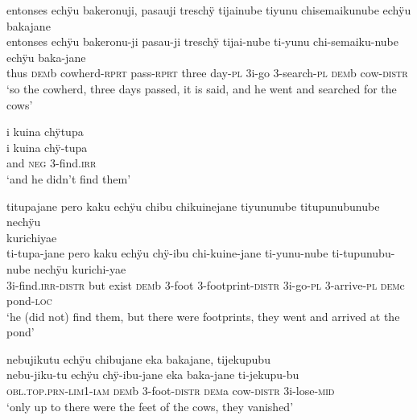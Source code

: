 \ea%
\begingl 
\glpreamble entonses echÿu bakeronuji, pasauji treschÿ tijainube tiyunu chisemaikunube echÿu \\bakajane\\
\gla entonses echÿu bakeronu-ji pasau-ji treschÿ tijai-nube ti-yunu chi-semaiku-nube echÿu baka-jane\\ 
\glb thus \textsc{dem}b cowherd-\textsc{rprt} pass-\textsc{rprt} three day-\textsc{pl} 3i-go 3-search-\textsc{pl} \textsc{dem}b cow-\textsc{distr}\\ 
\glft ‘so the cowherd, three days passed, it is said, and he went and searched for the cows’\\ 
\endgl
\xe

\ea%
\begingl 
\glpreamble i kuina chÿtupa\\
\gla i kuina chÿ-tupa\\ 
\glb and \textsc{neg} 3-find.\textsc{irr}\\ 
\glft ‘and he didn’t find them’\\ 
\endgl
\xe

\ea%
\begingl 
\glpreamble titupajane pero kaku echÿu chibu chikuinejane tiyununube titupunubunube nechÿu \\kurichiyae\\
\gla ti-tupa-jane pero kaku echÿu chÿ-ibu chi-kuine-jane ti-yunu-nube ti-tupunubu-nube nechÿu kurichi-yae\\ 
\glb 3i-find.\textsc{irr}-\textsc{distr} but exist \textsc{dem}b 3-foot 3-footprint-\textsc{distr} 3i-go-\textsc{pl} 3-arrive-\textsc{pl} \textsc{dem}c pond-\textsc{loc}\\ 
\glft ‘he (did not) find them, but there were footprints, they went and arrived at the pond’\\ 
\endgl
\xe


\ea%
\begingl 
\glpreamble nebujikutu echÿu chibujane eka bakajane, tijekupubu\\
\gla nebu-jiku-tu echÿu chÿ-ibu-jane eka baka-jane ti-jekupu-bu\\ 
\textsc{obl.top.prn}-\textsc{lim}1-\textsc{iam} \textsc{dem}b 3-foot-\textsc{distr} \textsc{dem}a cow-\textsc{distr} 3i-lose-\textsc{mid}\\ 
\glft ‘only up to there were the feet of the cows, they vanished’\\ 
\endgl
\xe

